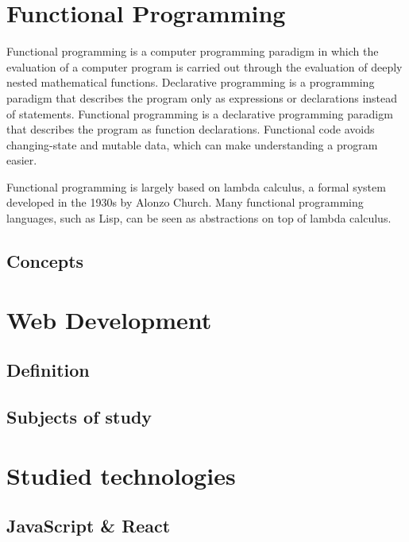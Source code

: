 \documentclass[12pt, titlepage]{article}
\begin{document}
\section{Functional Programming}

Functional programming is a computer programming paradigm in which the evaluation of a computer program is carried out
through the evaluation of deeply nested mathematical functions. Declarative programming is a programming paradigm that
describes the program only as expressions or declarations instead of statements. Functional programming is a declarative
programming paradigm that describes the program as function declarations. Functional code avoids changing-state and
mutable data, which can make understanding a program easier.

Functional programming is largely based on lambda calculus, a formal system developed in the 1930s by Alonzo Church.
Many functional programming languages, such as Lisp, can be seen as abstractions on top of lambda calculus. \cite{hudak}

\subsection{Concepts}

\section{Web Development}

\subsection{Definition}

\subsection{Subjects of study}

\section{Studied technologies}
\subsection{JavaScript \& React}
\end{document}
